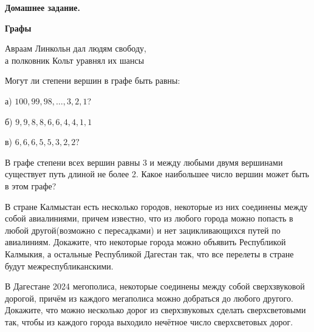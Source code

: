 \hspace{3mm}

\centerline{\bf \Huge Домашнее задание.}
\centerline{\bf \Huge Графы}

\begin{flushright}
    \scriptsize{Авраам Линкольн дал людям свободу,\\ а полковник Кольт уравнял их шансы}
\end{flushright}

Могут ли степени вершин в графе быть равны:

а) $100, 99, 98, \dotsc, 3, 2, 1$?
  
б) $9, 9, 8, 8, 6, 6, 4, 4, 1, 1$
  
в) $6, 6, 6, 5, 5, 3, 2, 2?$

 В графе степени всех вершин равны 3 и между любыми двумя вершинами существует путь длиной не более 2. Какое наибольшее число вершин может быть в этом графе?

 В стране Калмыстан есть несколько городов, некоторые из них соединены между собой авиалиниями, причем известно, что из любого города можно попасть в любой другой(возможно с пересадками) и нет зацикливающихся путей по авиалиниям. Докажите, что некоторые города можно объявить Республикой Калмыкия, а остальные Республикой Дагестан так, что все перелеты в стране будут межреспубликанскими.

В Дагестане 2024 мегополиса, некоторые соединены между собой сверхзвуковой дорогой, причём из каждого мегаполиса можно добраться до любого другого. Докажите, что можно несколько дорог из сверхзвуковых сделать сверхсветовыми так, чтобы из каждого города выходило нечётное число сверхсветовых дорог.